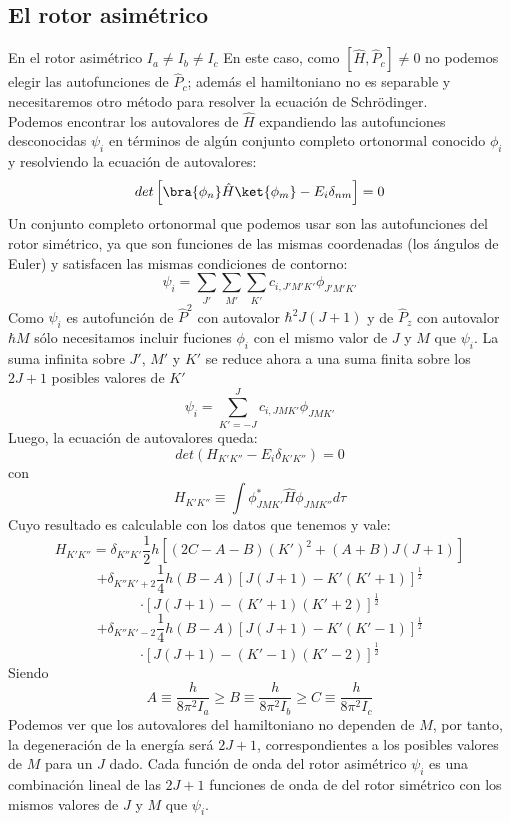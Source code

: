 \documentclass[a4paper]{article}
\begin{document}
\subsection{El rotor asimétrico}
En el rotor asimétrico $I_a\neq I_b\neq I_c$
En este caso, como $\left[\hat H,\hat P_c\right]\neq 0$ no podemos elegir las autofunciones de $\hat P_c$; además el hamiltoniano no es separable y necesitaremos otro método para resolver la ecuación de Schrödinger.\\
Podemos  encontrar los autovalores de $\hat H$ expandiendo las autofunciones desconocidas $\psi_i$ en términos de algún conjunto completo ortonormal conocido $\phi_i$ y resolviendo la ecuación de autovalores:
\begin{equation}
det \left[ \bra{\phi_n}\hat H\ket{\phi_m} - E_i\delta_{nm} \right]=0
\end{equation}
Un conjunto completo ortonormal que podemos usar son las autofunciones del rotor simétrico, ya que son funciones de las mismas coordenadas (los ángulos de Euler) y satisfacen las mismas condiciones de contorno:
\begin{equation}
\psi_i = \sum_{J'}\sum_{M'}\sum_{K'}c_{i,J'M'K'}\phi_{J'M'K'}
\end{equation}
Como $\psi_i$ es autofunción de $\hat P^2$ con autovalor $\hbar^2J(J+1)$ y de $\hat P_z$ con autovalor $\hbar M$ sólo necesitamos incluir fuciones $\phi_i$ con el mismo valor de $J$ y $M$ que $\psi_i$. La suma infinita sobre $J'$, $M'$ y $K'$ se reduce ahora a una suma finita sobre los $2J+1$ posibles valores de $K'$
\begin{equation}
\psi_i = \sum_{K'=-J}^Jc_{i,JMK'}\phi_{JMK'}
\end{equation}
Luego, la ecuación de autovalores queda:
\begin{equation}
det\left(H_{K'K''}-E_i\delta_{K'K''}\right)=0
\end{equation}
con
\begin{equation}
H_{K'K''}\equiv\int\phi^*_{JMK'}\hat H\phi_{JMK''}d\tau
\end{equation}
Cuyo resultado es calculable con los datos que tenemos y vale:
$$
H_{K'K''}=\delta_{K''K'}\frac{1}{2}h\left[\left(2C-A-B\right)\left(K'\right)^2+\left(A+B\right)J\left(J+1\right)\right]$$$$+\delta_{K''K'+2}\frac{1}{4}h\left(B-A\right)\left[J\left(J+1\right)-K'\left(K'+1\right)\right]^\frac{1}{2}$$$$\cdot\left[J\left(J+1\right)-\left(K'+1\right)\left(K'+2\right)\right]^\frac{1}{2}$$$$+\delta_{K''K'-2}\frac{1}{4}h\left(B-A\right)\left[J\left(J+1\right)-K'\left(K'-1\right)\right]^\frac{1}{2}$$
\begin{equation}
\cdot\left[J\left(J+1\right)-\left(K'-1\right)\left(K'-2\right)\right]^\frac{1}{2}
\end{equation}
Siendo
$$
A \equiv \frac{h}{8\pi^2I_a}\geq B\equiv \frac{h}{8\pi^2I_b}\geq C\equiv \frac{h}{8\pi^2I_c}
$$
Podemos ver que los autovalores del hamiltoniano no dependen de $M$, por tanto, la degeneración de la energía será $2J+1$, correspondientes a los posibles valores de $M$ para un $J$ dado.
Cada función de onda del rotor asimétrico $\psi_i$ es una combinación lineal de las $2J+1$ funciones de onda de del rotor simétrico con los mismos valores de $J$ y $M$ que $\psi_i$.
\end{document}
